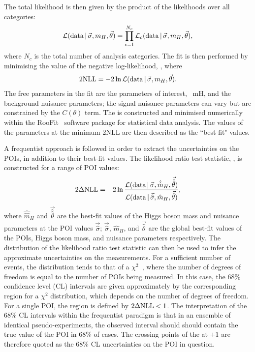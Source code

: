 The total likelihood \Like is then given by the product of the likelihoods over all categories:
\begin{equation}
\mathcal{L}(\textrm{data}\,|\,\vec{\sigma},m_{H},\vec{\theta}) = \prod^{N_c}_{c=1} \mathcal{L}_c(\textrm{data}\,|\,\vec{\sigma},m_{H},\vec{\theta}),
\end{equation}
where $N_c$ is the total number of analysis categories.
The fit is then performed by minimising the value of the negative log-likelihood, \NLL, where
\begin{equation}
2\textrm{NLL} = -2\ln\mathcal{L}(\textrm{data}\,|\,\vec{\sigma},m_{H},\vec{\theta}).
\end{equation}
The free parameters in the fit are the parameters of interest, \
mH, and the background nuisance parameters;
the signal nuisance parameters can vary but are constrained by the $C(\theta)$ term.
The \NLL is constructed and minimised numerically within the RooFit~\cite{RooFit} 
software package for statistical data analysis.
The values of the parameters at the minimum 2NLL are then described as the ``best-fit" values.

A frequentist approach is followed in order to extract the uncertainties on the POIs, 
in addition to their best-fit values.
The likelihood ratio test statistic, \dNLL, is constructed for a range of POI values:
\begin{equation}
2\Delta\textrm{NLL} = -2\ln\frac{ \mathcal{L}(\textrm{data}\,|\,\vec{\sigma},\hat{\hat{m}}_H,\vec{\hat{\hat{\theta}}}) }
                  { \mathcal{L}(\textrm{data}\,|\,\vec{\hat{\sigma}},\hat{m}_H,\vec{\hat{\theta}}) },
\end{equation}
where $\hat{\hat{m}}_H$ and $\vec{\hat{\hat{\theta}}}$ are the best-fit values 
of the Higgs boson mass and nuisance parameters at the POI values $\vec{\hat{\sigma}}$;
$\vec{\hat{\sigma}}$, $\hat{m}_H$, and $\vec{\hat{\theta}}$ are the global best-fit values 
of the POIs, Higgs boson mass, and nuisance parameters respectively.
The distribution of the likelihood ratio test statistic 
can then be used to infer the approximate uncertainties on the measurements.
For a sufficient number of events, %
the distribution tends to that of a $\chi^2$~\cite{Asymptotic}, 
where the number of degrees of freedom is equal to the number of POIs being measured.
In this case, the 68\% confidence level (CL) intervals 
are given approximately by the corresponding region for a $\chi^2$ distribution, 
which depends on the number of degrees of freedom.
For a single POI, the region is defined by $2\Delta\textrm{NLL} < 1$.
The interpretation of the 68\% CL intervals within the frequentist paradigm 
is that in an ensemble of identical pseudo-experiments, 
the observed interval should should contain the true value of the POI in 68\% of cases.
The crossing points of the \dNLL at $\pm 1$ are therefore quoted
as the 68\% CL uncertainties on the POI in question.

